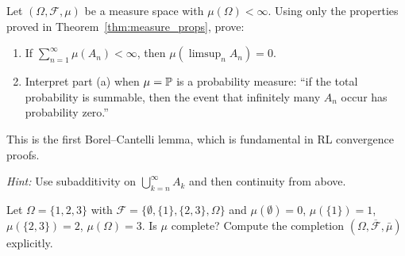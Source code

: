\documentclass[11pt,a4paper]{article}
\begin{document}
\begin{exercise}
\label{ex:borel_cantelli_prep}
Let $(\Omega, \mathcal{F}, \mu)$ be a measure space with
$\mu(\Omega) < \infty$. Using only the properties proved in
Theorem~\ref{thm:measure_props}, prove:
\begin{enumerate}[label=(\alph*)]
  \item If $\sum_{n=1}^\infty \mu(A_n) < \infty$, then
    $\mu(\limsup_n A_n) = 0$.
  \item Interpret part (a) when $\mu = \mathbb{P}$ is a probability
    measure: ``if the total probability is summable, then the event
    that infinitely many $A_n$ occur has probability zero.''
\end{enumerate}
This is the first Borel--Cantelli lemma, which is fundamental in RL
convergence proofs.

\textit{Hint:} Use subadditivity on
$\bigcup_{k=n}^\infty A_k$ and then continuity from above.
\end{exercise}

\begin{exercise}
\label{ex:counting_completion}
Let $\Omega = \{1, 2, 3\}$ with
$\mathcal{F} = \bigl\{\emptyset, \{1\}, \{2,3\}, \Omega\bigr\}$ and
$\mu(\emptyset) = 0$, $\mu(\{1\}) = 1$, $\mu(\{2,3\}) = 2$,
$\mu(\Omega) = 3$. Is $\mu$ complete? Compute the completion
$(\Omega, \overline{\mathcal{F}}, \bar{\mu})$ explicitly.
\end{exercise}


\end{document}
